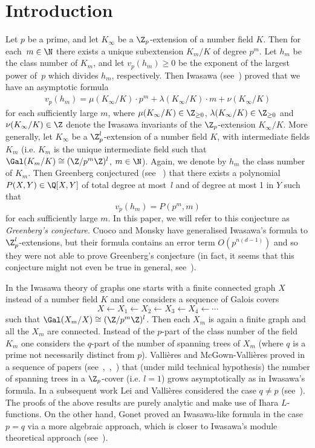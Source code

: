 \section{Introduction} \label{section:intro} 

Let $p$ be a prime, and let $K_\infty$ be a $\Z_p$-extension of a number field $K$. Then for each~${m \in \N}$ there exists a unique subextension $K_m/K$ of degree $p^m$. Let $h_m$ be the class number of $K_m$, and let ${v_p(h_m) \ge 0}$ be the exponent of the largest power of~$p$ which divides $h_m$, respectively. Then Iwasawa (see~\cite{iwasawa}) proved that we have an asymptotic formula 
\begin{align} \label{eq:iw} 
	v_p(h_m) = \mu(K_\infty/K) \cdot p^m + \lambda(K_\infty/K) \cdot m + \nu(K_\infty/K) 
\end{align} 
for each sufficiently large $m$, where $\mu(K_\infty/K)\in \Z_{\ge 0}$, $\lambda(K_\infty/K)\in \Z_{\ge 0}$ and $\nu(K_\infty/K)\in \Z$ denote the Iwasawa invariants of the $\Z_p$-extension $K_\infty/K$. More generally, let $K_\infty$ be a $\Z_p^l$-extension of a number field $K$, with intermediate fields $K_m$ (i.e. $K_m$ is the unique intermediate field such that ${\Gal(K_m/K) \cong (\Z/p^m\Z)^l}$, ${m \in \N}$). Again, we denote by $h_m$ the class number of $K_m$. Then Greenberg conjectured (see ~\cite[Section~7]{cuoco-monsky}) that there exists a polynomial ${P(X,Y) \in \Q[X,Y]}$ of total degree at most~$l$ and of degree at most 1 in $Y$ such that 
\[ v_p(h_m) = P(p^m,m) \] 
for each sufficiently large $m$. In this paper, we will refer to this conjecture as \emph{Greenberg's conjecture}. Cuoco and Monsky have generalised Iwasawa's formula to $\Z_p^l$-extensions, but their formula contains an error term $O(p^{n(d-1)})$ and so they were not able to prove Greenberg's conjecture (in fact, it seems that this conjecture might not even be true in general, see~\cite{cuoco-monsky}). 

In the Iwasawa theory of graphs one starts with a finite connected graph $X$ instead of a number field $K$ and one considers a sequence of Galois covers
\[X\leftarrow X_1\leftarrow X_2\leftarrow X_3\leftarrow X_4\leftarrow \cdots \] 
such that $\Gal(X_m/X)\cong (\Z/p^m\Z)^l$. Then each $X_m$ is again a finite graph and all the $X_m$ are connected. Instead of the $p$-part of the class number of the field $K_m$ one considers the $q$-part of the number of spanning trees of $X_m$ (where $q$ is a prime not necessarily distinct from $p$). Valli\`eres and McGown-Valli\`eres proved in a sequence of papers (see~\cite{vallieres1},~\cite{vallieres2},~\cite{vallieres3}) that (under mild technical hypothesis) the number of spanning trees in a $\Z_p$-cover (i.e. ${l = 1}$) grows asymptotically as in Iwasawa's formula. In a subsequent work Lei and Valli\`eres considered the case ${q \neq p}$ (see~\cite{vallieres-lei}). The proofs of the above results are purely analytic and make use of Ihara $L$-functions. On the other hand, Gonet proved an Iwasawa-like formula in the case ${p = q}$ via a more algebraic approach, which is closer to Iwasawa's module theoretical approach (see~\cite{gonet}). 

